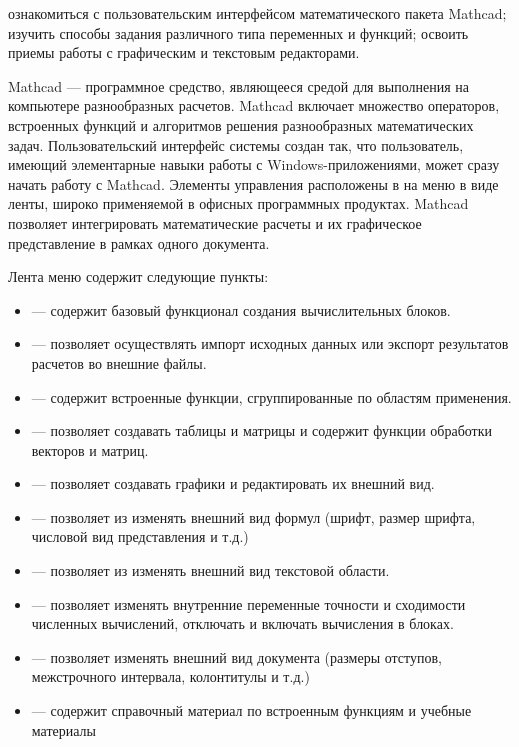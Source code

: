 
\goal ознакомиться с пользовательским интерфейсом математического пакета Mathcad; изучить способы задания различного типа переменных и функций; освоить приемы работы с графическим и текстовым редакторами.

Mathcad --- программное средство, являющееся средой для выполнения на компьютере разнообразных расчетов. Mathcad включает множество операторов, встроенных функций и алгоритмов решения разнообразных математических задач. Пользовательский интерфейс системы создан так, что пользователь, имеющий элементарные навыки работы с Windows-приложениями, может сразу начать работу с Mathcad. Элементы управления расположены в на меню в виде ленты, широко применяемой в офисных программных продуктах. Mathcad позволяет интегрировать математические расчеты и их графическое представление в рамках одного документа.

Лента меню содержит следующие пункты:
\begin{itemize}
	\item {} --- содержит базовый функционал создания вычислительных блоков.
	\item {} --- позволяет осуществлять импорт исходных данных или экспорт результатов расчетов во внешние файлы.
	\item {} --- содержит встроенные функции, сгруппированные по областям применения.
	\item {} --- позволяет создавать таблицы и матрицы и содержит функции обработки векторов и матриц.
	\item  {} --- позволяет создавать графики и редактировать их внешний вид.
	\item {} --- позволяет из изменять внешний вид формул (шрифт, размер шрифта, числовой вид представления и т.д.)
	\item {} --- позволяет из изменять внешний вид текстовой области.
	\item {} --- позволяет изменять внутренние переменные точности и сходимости численных вычислений, отключать и включать вычисления в блоках.
	\item {} --- позволяет изменять внешний вид документа (размеры отступов, межстрочного интервала, колонтитулы и т.д.)
	\item {} --- содержит справочный материал по встроенным функциям и учебные материалы 
\end{itemize} 

